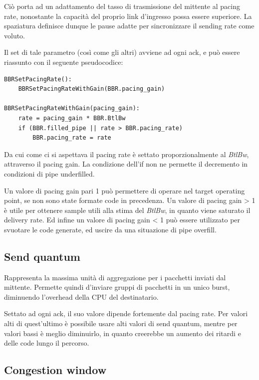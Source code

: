 Ciò porta ad un adattamento del tasso di trasmissione del mittente al pacing rate, nonostante la capacità del proprio link d'ingresso possa essere superiore. La spaziatura definisce dunque le pause adatte per sincronizzare il sending rate come voluto. \bigskip

Il set di tale parametro (così come gli altri) avviene ad ogni ack, e può essere riassunto con il seguente pseudocodice:

\begin{lstlisting}[caption=BBRSetPacingRate]
BBRSetPacingRate():
	BBRSetPacingRateWithGain(BBR.pacing_gain)

BBRSetPacingRateWithGain(pacing_gain):
	rate = pacing_gain * BBR.BtlBw
	if (BBR.filled_pipe || rate > BBR.pacing_rate)
		BBR.pacing_rate = rate

\end{lstlisting}

Da cui come ci si aspettava il pacing rate è settato proporzionalmente al \textit{BtlBw}, attraverso il pacing gain.
La condizione dell'if non ne permette il decremento in condizioni di pipe underfilled. \bigskip

Un valore di pacing gain pari 1 può permettere di operare nel target operating point, se non sono state formate code in precedenza. Un valore di pacing gain > 1 è utile per ottenere sample utili alla stima del \textit{BtlBw}, in quanto viene saturato il delivery rate. Ed infine un valore di pacing gain < 1 può essere utilizzato per svuotare le code generate, ed uscire da una situazione di pipe overfill.

\subsection{Send quantum}

Rappresenta la massima unità di aggregazione per i pacchetti inviati dal mittente. Permette quindi d'inviare gruppi di pacchetti in un unico burst, diminuendo l'overhead della CPU del destinatario. \bigskip

Settato ad ogni ack, il suo valore dipende fortemente dal pacing rate. Per valori alti di quest'ultimo è possibile usare alti valori di send quantum, mentre per valori bassi è meglio diminuirlo, in quanto creerebbe un aumento dei ritardi e delle code lungo il percorso.

\subsection{Congestion window}

